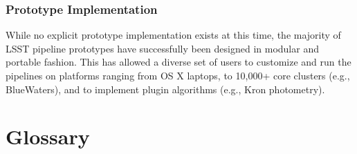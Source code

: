 \documentclass[12pt]{article}
\begin{document}
\subsubsection{Prototype Implementation}

While no explicit prototype implementation exists at this time, the majority of LSST pipeline prototypes have successfully been designed in modular and portable fashion. This has allowed a diverse set of users to customize and run the pipelines on platforms ranging from OS X laptops, to 10,000+ core clusters (e.g., BlueWaters), and to implement plugin algorithms (e.g., Kron photometry).



\section{Glossary}
\end{document}
